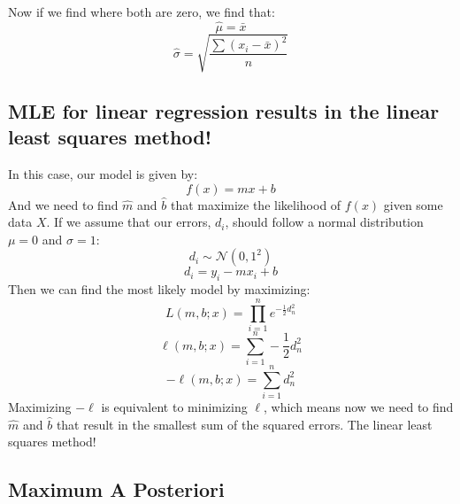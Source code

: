 \documentclass[english,course]{lecture}
\begin{document}
Now if we find where both are zero, we find that:
    \[\hat{\mu} = \bar{x}\]
    \[\hat{\sigma} = \sqrt{\frac{\sum(x_i - \bar{x})^2}{n}}\]
\subsection{MLE for linear regression results in the linear least squares method!}
In this case, our model is given by:
\[f(x) = mx + b\]
And we need to find \(\hat{m}\) and \(\hat{b}\) that maximize the likelihood of \(f(x)\) given some data \(X\).
If we assume that our errors, \(d_i\), should follow a normal distribution \(\mu = 0\) and \(\sigma = 1\):
\[d_i \sim \mathcal{N}(0, 1^2)\]
\[d_i = y_i - m x_i + b\]
Then we can find the most likely model by maximizing:
\[L(m, b; x) = \prod_{i=1}^n e^{-\frac{1}{2}d_n^2}\]
\[\ell(m, b; x) = \sum_{i=1}^n -\frac{1}{2} d_n^2\]
\[-\ell(m, b; x) = \sum_{i=1}^n d_n^2\]
Maximizing \(-\ell\) is equivalent to minimizing \(\ell\), which means now we need to find \(\hat{m}\) and \(\hat{b}\) that result in the smallest sum of the squared errors.
The linear least squares method!

    \subsection{Maximum A Posteriori}
\end{document}
